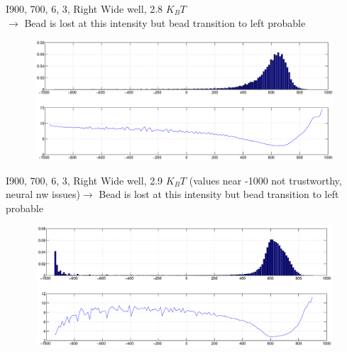 \documentclass{beamer}
\begin{document}
\begin{frame}{I900, 700, 6, 3, Right} 
Wide well, 2.8 $K_BT$ \\$\rightarrow$ Bead is lost at this intensity but bead transition to left probable
\begin{figure}
    \centering
    \includegraphics[height=4.5cm,width=12cm]{I900_right_16.eps}
    \label{fig:graph18}
\end{figure}


\end{frame}

\begin{frame}{I900, 700, 6, 3, Right} 
Wide well, 2.9 $K_BT$ (values near -1000 not trustworthy, neural nw issues)$\rightarrow$ Bead is lost at this intensity but bead transition to left probable
\begin{figure}
    \centering
    \includegraphics[height=4.5cm,width=12cm]{I900_both_2.eps}
    \label{fig:graph19}
\end{figure}


\end{frame}
\end{document}
